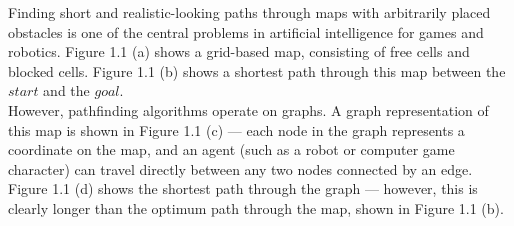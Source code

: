 \documentclass[12pt,notitlepage]{report}
\begin{document}
Finding short and realistic-looking paths through maps with arbitrarily placed obstacles is one of the central problems in artificial intelligence for games and robotics. Figure 1.1 (a) shows a grid-based map, consisting of free cells and blocked cells. Figure 1.1 (b) shows a shortest path through this map between the $start$ and the $goal$.\\

\noindent
However, pathfinding algorithms operate on graphs. A graph representation of this map is shown in Figure 1.1 (c) --- each node in the graph represents a coordinate on the map, and an agent (such as a robot or computer game character) can travel directly between any two nodes connected by an edge. Figure 1.1 (d) shows the shortest path through the graph --- however, this is clearly longer than the optimum path through the map, shown in Figure 1.1 (b).\\
\end{document}
